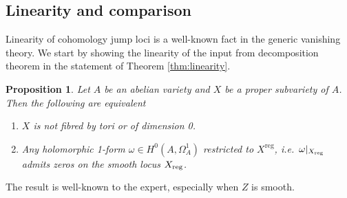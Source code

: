 \documentclass[12pt,reqno]{amsart}
\newtheorem{proposition}[theorem]{Proposition}
\theoremstyle{question}
\theoremstyle{definition}
\theoremstyle{remark}
\theoremstyle{cited}
\theoremstyle{citeddef}
\DeclareMathOperator{\reg}{reg}                  %
\begin{document}
\subsection{Linearity and comparison}
Linearity of cohomology jump loci is a well-known fact in the generic vanishing theory. We start by showing the linearity of the input
from decomposition theorem in the statement of Theorem \ref{thm:linearity}. 
\begin{proposition}\label{van-nonsimple}
Let $A$ be an abelian variety and $X$ be a proper subvariety of $A$. Then the following are equivalent
\begin{enumerate}
	\item $X$ is not fibred by tori or of dimension 0. 
	\item Any holomorphic 1-form $\omega\in H^0(A, \Omega_A^1)$ restricted to $X^{\reg}$, i.e.\ $\omega|_{X_{\textnormal{reg}}}$ admits zeros on the smooth locus $X_{\textnormal{reg}}$.
\end{enumerate}
\end{proposition}
The result is well-known to the expert, especially when $Z$ is smooth. 
\end{document}
